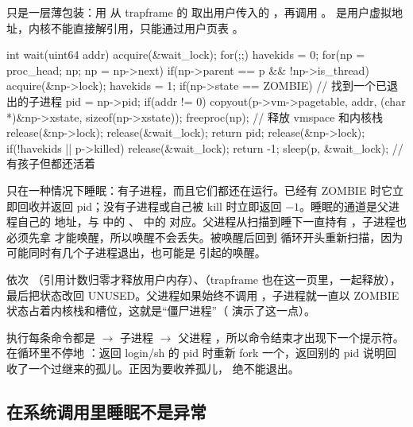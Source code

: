  只是一层薄包装：用  从 trapframe 的  取出用户传入的 ，再调用 。 是用户虚拟地址，内核不能直接解引用，只能通过用户页表 。

\begin{ccode}
int wait(uint64 addr)
{
  acquire(&wait_lock);
  for(;;){
    havekids = 0;
    for(np = proc_head; np; np = np->next){
      if(np->parent == p && !np->is_thread){
        acquire(&np->lock);
        havekids = 1;
        if(np->state == ZOMBIE){                 // 找到一个已退出的子进程
          pid = np->pid;
          if(addr != 0) copyout(p->vm->pagetable, addr,
                                (char *)&np->xstate, sizeof(np->xstate));
          freeproc(np);                          // 释放 vmspace 和内核栈
          release(&np->lock); release(&wait_lock);
          return pid;
        }
        release(&np->lock);
      }
    }
    if(!havekids || p->killed){ release(&wait_lock); return -1; }
    sleep(p, &wait_lock);                        // 有孩子但都还活着
  }
}
\end{ccode}

 只在一种情况下睡眠：有子进程，而且它们都还在运行。已经有 ZOMBIE 时它立即回收并返回 pid；没有子进程或自己被 kill 时立即返回 $-1$。睡眠的通道是父进程自己的  地址，与  中的 、 中的  对应。父进程从扫描到睡下一直持有 ，子进程也必须先拿  才能唤醒，所以唤醒不会丢失。被唤醒后回到  循环开头重新扫描，因为可能同时有几个子进程退出，也可能是  引起的唤醒。

 依次 （引用计数归零才释放用户内存）、（trapframe 也在这一页里，一起释放），最后把状态改回 UNUSED。父进程如果始终不调用 ，子进程就一直以 ZOMBIE 状态占着内核栈和槽位，这就是“僵尸进程”（ 演示了这一点）。

 执行每条命令都是  $\to$ 子进程  $\to$ 父进程 ，所以命令结束才出现下一个提示符。 在循环里不停地 ：返回 login/sh 的 pid 时重新 fork 一个，返回别的 pid 说明回收了一个过继来的孤儿。正因为要收养孤儿， 绝不能退出。

\subsection{在系统调用里睡眠不是异常}


